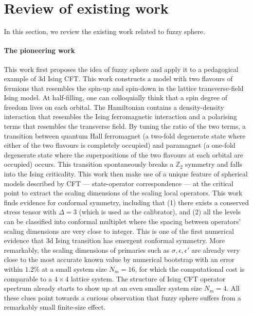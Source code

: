 \documentclass{timesjhep}
\begin{document}
\section{Review of existing work}
\label{sec:review}

In this section, we review the existing work related to fuzzy sphere. 

\paragraph{The pioneering work~\cite{Zhu2022}}

This work first proposes the idea of fuzzy sphere and apply it to a pedagogical example of 3d Ising CFT. This work constructs a model with two flavours of fermions that resembles the spin-up and spin-down in the lattice transverse-field Ising model. At half-filling, one can colloquially think that a spin degree of freedom lives on each orbital. The Hamiltonian contains a density-density interaction that resembles the Ising ferromagnetic interaction and a polarising terms that resembles the transverse field. By tuning the ratio of the two terms, a transition between quantum Hall ferromagnet (a two-fold degenerate state where either of the two flavours is completely occupied) and paramagnet (a one-fold degenerate state where the superpositions of the two flavours at each orbital are occupied) occurs. This transition spontaneously breaks a $\mathbb{Z}_2$ symmetry and falls into the Ising criticality. This work then make use of a unique feature of spherical models described by CFT --- state-operator correspondence --- at the critical point to extract the scaling dimensions of the scaling local operators. This work finds evidence for conformal symmetry, including that (1) there exists a conserved stress tensor with $\Delta=3$ (which is used as the calibrator), and (2) all the levels can be classified into conformal multiplet where the spacing between operators' scaling dimensions are very close to integer. This is one of the first numerical evidence that 3d Ising transition has emergent conformal symmetry. More remarkably, the scaling dimensions of primaries such as $\sigma,\epsilon,\epsilon'$ are already very close to the most accurate known value by numerical bootstrap with an error within $1.2\%$ at a small system size $N_m=16$, for which the computational cost is comparable to a $4\times4$ lattice system. The structure of Ising CFT operator spectrum already starts to show up at an even smaller system size $N_m=4$. All these clues point towards a curious observation that fuzzy sphere suffers from a remarkably small finite-size effect. 
\end{document}
